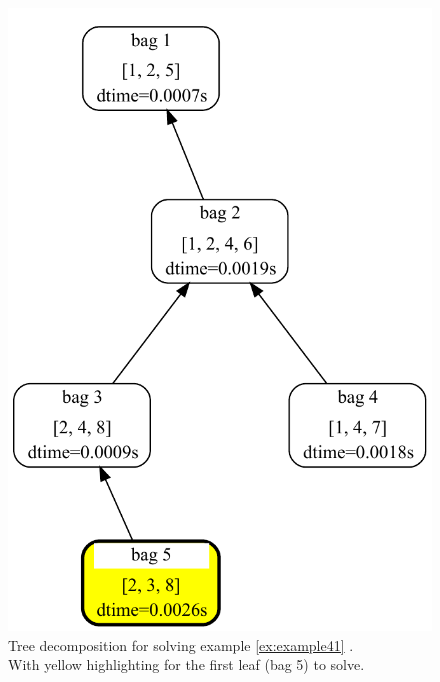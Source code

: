 \documentclass[a4paper, 12pt, bibliography=totoc]{scrartcl}
\begin{document}
\begin{figure}[H]
	\centering
	\includegraphics[height=0.6\textheight]{images/DA4SAT/results/TDStep1.pdf}
	\caption{Tree decomposition for solving example \ref{ex:example41} . \\
		With yellow highlighting for the first leaf (bag 5) to solve.}
\end{figure}
\end{document}
